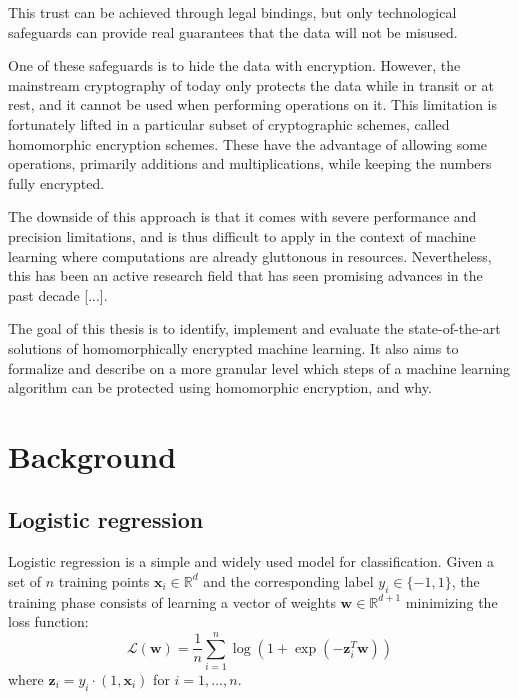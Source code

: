 \documentclass[a4paper,11pt,oneside]{report}
\begin{document}
This trust can be achieved through legal bindings, but only technological safeguards can provide real guarantees that the data will not be misused.

One of these safeguards is to hide the data with encryption. However, the mainstream cryptography of today only protects the data while in transit or at rest, and it cannot be used when performing operations on it. This limitation is fortunately lifted in a particular subset of cryptographic schemes, called homomorphic encryption schemes. These have the advantage of allowing some operations, primarily additions and multiplications, while keeping the numbers fully encrypted.

The downside of this approach is that it comes with severe performance and precision limitations, and is thus difficult to apply in the context of machine learning where computations are already gluttonous in resources. Nevertheless, this has been an active research field that has seen promising advances in the past decade [...].

The goal of this thesis is to identify, implement and evaluate the state-of-the-art solutions of homomorphically encrypted machine learning. It also aims to formalize and describe on a more granular level which steps of a machine learning algorithm can be protected using homomorphic encryption, and why.


\chapter{Background}



\section{Logistic regression}

Logistic regression is a simple and widely used model for classification. Given a set of $n$ training points $\mathbf{x}_i \in \mathbb{R}^d$ and the corresponding label $y_i \in \{-1,1\}$, the training phase consists of learning a vector of weights $\mathbf{w} \in \mathbb{R}^{d+1}$ minimizing the loss function:
\begin{equation}\label{logistic_reg_train}
    \mathcal{L}(\mathbf{w}) = \frac{1}{n} \sum_{i=1}^{n} \log(1 + \exp(-\mathbf{z}_i^T \mathbf{w})) 
\end{equation}
where $\mathbf{z}_i = y_i \cdot (1, \mathbf{x}_i)$ for $i=1,...,n$.
\end{document}
